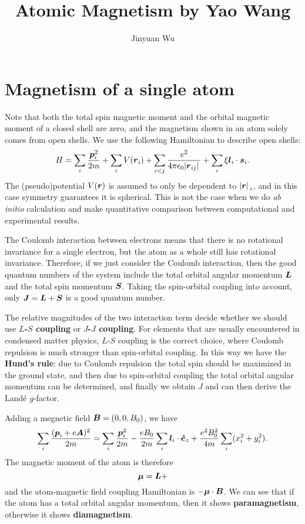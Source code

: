 \documentclass[hyperref, a4paper]{article}
\title{Atomic Magnetism by Yao Wang}
\author{Jinyuan Wu}
\newcommand*{\concept}[1]{{\textbf{#1}}}
\begin{document}
\maketitle

\section{Magnetism of a single atom}

Note that both the total spin magnetic moment and the orbital magnetic moment of a closed shell are zero, 
and the magnetism shown in an atom solely comes from open shells.
We use the following Hamiltonian to describe open shells:
\begin{equation}
    H = \sum_i \frac{\vb*{p}_i^2}{2m} + \sum_i V(\vb*{r}_i) + 
    \sum_{i < j} \frac{e^2}{4 \pi \epsilon_0 \abs*{\vb*{r}_{ij}}} + \sum_i \xi \vb*{l}_i \cdot \vb*{s}_i.
\end{equation}
The (pseudo)potential $V(\vb*{r})$ is assumed to only be dependent to $\abs*{\vb*{r}}_i$, and in this case symmetry guarantees 
it is spherical. This is not the case when we do \emph{ab initio} calculation and make quantitative comparison between 
computational and experimental results. 

The Coulomb interaction between electrons means that there is no rotational invariance for a single electron, but the atom 
as a whole still has rotational invariance. Therefore, if we just consider the Coulomb interaction, then the good quantum 
numbers of the system include the total orbital angular momentum $\vb*{L}$ and the total spin momentum $\vb*{S}$.
Taking the spin-orbital coupling into account, only $\vb*{J} = \vb*{L} + \vb*{S}$ is a good quantum number.

The relative magnitudes of the two interaction term decide whether we should use \concept{$L$-$S$ coupling} 
or \concept{$J$-$J$ coupling}. For elements that are usually encountered in condensed matter physics, $L$-$S$ coupling
is the correct choice, where Coulomb repulsion is much stronger than spin-orbital coupling.
In this way we have the \concept{Hund's rule}: due to Coulomb repulsion the total spin should be maximized in the ground state,
and then due to spin-orbital coupling the total orbital angular momentum can be determined, and finally we obtain $J$ and 
can then derive the Landé $g$-factor.

Adding a megnetic field $\vb*{B} = (0, 0, B_0)$, we have 
\begin{equation}
    \sum_i \frac{(\vb*{p}_i + e \vb*{A})^2}{2m} = \sum_i \frac{\vb*{p}_i^2}{2m} 
    - \frac{e B_0}{2m} \sum_i \vb*{l}_i \cdot \vu*{e}_z + \frac{e^2 B_0^2}{4m} \sum_i (x_i^2 + y_i^2).
\end{equation}
The magnetic moment of the atom is therefore 
\begin{equation}
    \vb*{\mu} = \vb*{L} + %
\end{equation}
and the atom-magnetic field coupling Hamiltonian is $- \vb*{\mu} \cdot \vb*{B}$.
We can see that if the atom has a total orbital angular momentum, then it shows \concept{paramagnetism}, 
otherwise it shows \concept{diamagnetism}.
\end{document}
